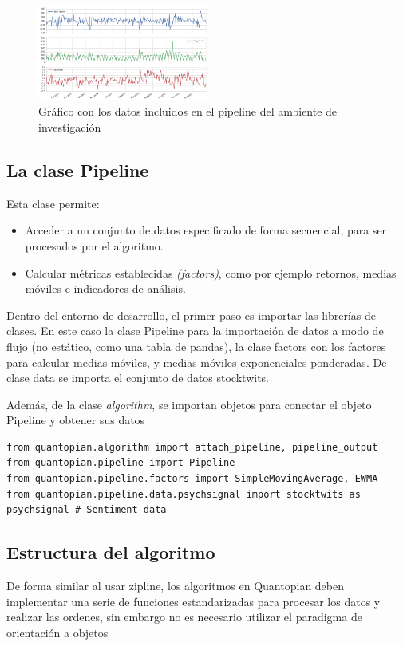\documentclass[a4paper, 11pt, twocolumn]{article}
\begin{document}
\begin{figure}[ht]
\centering
\includegraphics[width=0.5\textwidth]{research.png}
\caption{\label{fig:sol_iter}Gráfico con los datos incluidos en el pipeline del ambiente de investigación}
\end{figure}


\subsection{La clase Pipeline}
Esta clase permite:

\begin{itemize}
    \item Acceder a un conjunto de datos especificado de forma secuencial, para ser procesados por el algoritmo.
    \item Calcular métricas establecidas \textit{(factors)}, como por ejemplo retornos, medias móviles e indicadores de análisis.
\end{itemize}

Dentro del entorno de desarrollo, el primer paso es importar las librerías de clases. En este caso la clase Pipeline para la importación de datos a modo de flujo (no estático, como una tabla de pandas), la clase factors con los factores para calcular medias móviles, y medias móviles exponenciales ponderadas. De clase data se importa el conjunto de datos stocktwits.

Además, de la clase \textit{algorithm}, se importan objetos para conectar el objeto Pipeline y obtener sus datos

\lstset{columns=fullflexible, xleftmargin=1cm, basicstyle=\footnotesize, language=Python, breaklines=true, numbers=left} 
\begin{lstlisting}
from quantopian.algorithm import attach_pipeline, pipeline_output
from quantopian.pipeline import Pipeline
from quantopian.pipeline.factors import SimpleMovingAverage, EWMA
from quantopian.pipeline.data.psychsignal import stocktwits as psychsignal # Sentiment data
\end{lstlisting}

\subsection{Estructura del algoritmo}
De forma similar al usar zipline, los algoritmos en Quantopian deben implementar una serie de funciones estandarizadas para procesar los datos y realizar las ordenes, sin embargo no es necesario utilizar el paradigma de orientación a objetos
\end{document}
